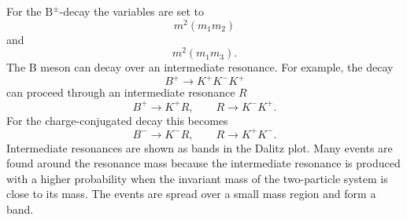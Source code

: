 For the $\text{B}^{\pm}$-decay the variables are set to
\begin{equation*}
m^2(m_1 m_2)
\end{equation*}
and
\begin{equation*}
m^2(m_1 m_3).
\end{equation*}
The B meson can decay over an intermediate resonance. For example, the decay
\begin{equation*}
B^+ \to K^+ K^- K^+
\end{equation*}
can proceed through an intermediate resonance $R$
\begin{equation*}
B^+ \to K^+ R, \qquad R \to K^- K^+ .
\end{equation*}
For the charge-conjugated decay this becomes
\begin{equation*}
B^- \to K^- R, \qquad R \to K^+ K^- .
\end{equation*}
Intermediate resonances are shown as bands in the Dalitz plot. Many events are found around the resonance mass because the intermediate resonance is produced with a higher probability when the invariant mass of the two-particle system is close to its mass. The events are spread over a small mass region and form a band.

